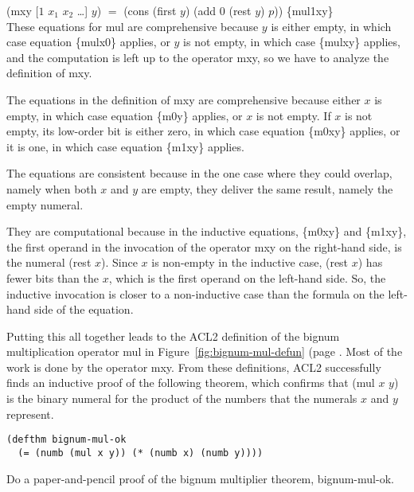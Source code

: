 \hspace*{2cm} \textsf{(mxy [$1$ $x_1$ $x_2$ \dots] $y$)} $=$ \textsf{(cons (first $y$) (add 0 (rest $y$) $p$))} \hfill \{mul1xy\}
\\

These equations for \textsf{mul} are comprehensive because $y$ is either empty,
in which case equation \{mulx0\} applies,
or $y$ is not empty, in which case \{mulxy\} applies, and
the computation is left up to the operator \textsf{mxy},
so we have to analyze the definition of \textsf{mxy}.

The equations in the definition of \textsf{mxy} are comprehensive
because either $x$ is empty, in which case
equation \{m0y\} applies, or $x$ is not empty.
If $x$ is not empty, its low-order bit is either zero,
in which case equation \{m0xy\} applies, or it is one,
in which case equation \{m1xy\} applies.

The equations are consistent because in the one case
where they could overlap, namely when both $x$ and $y$
are empty, they deliver the same result, namely the empty numeral.

They are computational because in the inductive equations,
\{m0xy\} and \{m1xy\}, the first operand in
the invocation of the operator \textsf{mxy} on the right-hand side,
is the numeral \textsf{(rest $x$)}. 
Since $x$ is non-empty in the inductive case,
\textsf{(rest $x$)} has fewer bits than the $x$, which is the first operand
on the left-hand side.
So, the inductive invocation is closer to a non-inductive
case than the formula on the left-hand side of the equation.

Putting this all together leads to the ACL2 definition
of the bignum multiplication operator \textsf{mul} in
Figure~\ref{fig:bignum-mul-defun} (page \pageref{fig:bignum-mul-defun}.
Most of the work is done by the operator \textsf{mxy}.
From these definitions, ACL2 successfully finds an
inductive proof of the following theorem,
which confirms that \textsf{(mul $x$ $y$)} is the binary numeral
for the product of the numbers that the numerals $x$ and $y$ represent.

\label{bignum-mul-thm}
\begin{Verbatim}
(defthm bignum-mul-ok
  (= (numb (mul x y)) (* (numb x) (numb y))))
\end{Verbatim}

\begin{ExerciseList}
\Exercise
Do a paper-and-pencil proof of
the bignum multiplier theorem, \textsf{bignum-mul-ok}.
\end{ExerciseList}


